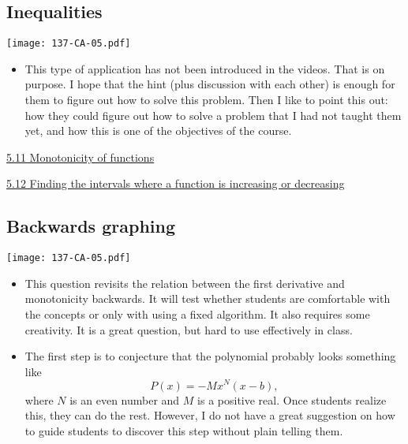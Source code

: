 \documentclass[11pt]{article}
\newcommand{\nl}{\hfill \vspace{-1.1\baselineskip}} %
\newcommand{\vxi}{\hspace{8mm} \href{https://www.youtube.com/watch?v=HlzVrFcqi04&list=PLlwePzQY_wW9m5oabUf6hvfVfAaA9uAwM&index=11}{5.11 Monotonicity of functions}}
\newcommand{\vxii}{\hspace{8mm} \href{https://www.youtube.com/watch?v=HsMHLIwKmFo&list=PLlwePzQY_wW9m5oabUf6hvfVfAaA9uAwM&index=12}{5.12 Finding the intervals where a function is increasing or decreasing}}
\begin{document}
\newpage

\subsection{Inequalities}

\begin{center}
{ \texttt{[image: 137-CA-05.pdf]}} 
\end{center}


\begin{comments}
\nl
\begin{itemize}
\item This type of application has not been introduced in the videos.  That is on purpose.  I hope that the hint (plus discussion with each other) is enough for them to figure out how to solve this problem.  Then I like to point this out: how they could figure out how to solve a problem that I had not taught them yet, and how this is one of the objectives of the course.
\end{itemize}	
\end{comments}

\begin{videos}
\vxi

\vxii
\end{videos}

\newpage
\subsection{Backwards graphing}

\begin{center}
{ \texttt{[image: 137-CA-05.pdf]}} 
\end{center}


\begin{comments}
\nl
\begin{itemize}
\item This question revisits the relation between the first derivative and monotonicity backwards.  It will test whether students are comfortable with the concepts or only with using a fixed algorithm.  It also requires some creativity. It is a great question, but hard to use effectively in class.

\item The first step is to conjecture that the polynomial probably looks something like 
	$$P(x) = - M x^N (x-b),$$ 
	where $N$ is an even number and $M$ is a positive real.  Once students realize this, they can do the rest.  However, I do not have a great suggestion on how to guide students to discover this step without plain telling them.
\end{itemize}	
\end{comments}
\end{document}
